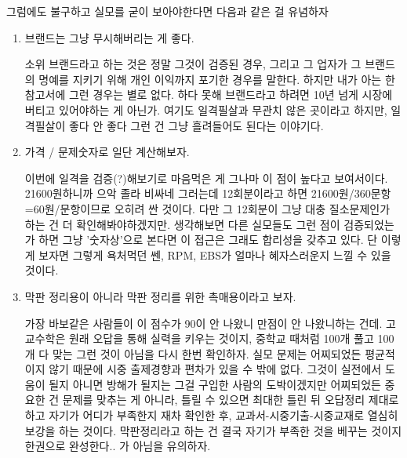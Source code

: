 그럼에도 불구하고 실모를 굳이 보아야한다면 다음과 같은 걸 유념하자
\vspace{5mm}
\begin{enumerate}
    \item 브랜드는 그냥 무시해버리는 게 좋다.
    \vspace{5mm}
    
    소위 브랜드라고 하는 것은 정말 그것이 검증된 경우,
    그리고 그 업자가 그 브랜드의 명예를 지키기 위해 개인 이익까지 포기한 경우를 말한다.
    하지만 내가 아는 한 참고서에 그런 경우는 별로 없다.
    하다 못해 브랜드라고 하려면 10년 넘게 시장에 버티고 있어야하는 게 아닌가.
    여기도 일격필살과 무관치 않은 곳이라고 하지만, 일격필살이 좋다 안 좋다 그런 건 그냥 흘려들어도 된다는 이야기다.
    \vspace{5mm}
    
    \item  가격 / 문제숫자로 일단 계산해보자.
    \vspace{5mm}
    
    이번에 일격을 검증(?)해보기로 마음먹은 게 그나마 이 점이 높다고 보여서이다.
    21600원하니까 으악 졸라 비싸네 그러는데 12회분이라고 하면 21600원/360문항=60원/문항이므로 오히려 싼 것이다.
    다만 그 12회분이 그냥 대충 질소문제인가 하는 건 더 확인해봐야하겠지만.
    생각해보면 다른 실모들도 그런 점이 검증되었는가 하면 그냥 '숫자상'으로 본다면 이 접근은 그래도 합리성을 갖추고 있다.
    단 이렇게 보자면 그렇게 욕처먹던 쎈, RPM, EBS가 얼마나 혜자스러운지 느낄 수 있을 것이다.
    \vspace{5mm}
    
    \item  막판 정리용이 아니라 막판 정리를 위한 촉매용이라고 보자.
    \vspace{5mm}
    
    가장 바보같은 사람들이 이 점수가 90이 안 나왔니 만점이 안 나왔니하는 건데.
    고교수학은 원래 오답을 통해 실력을 키우는 것이지, 중학교 때처럼 100개 풀고 100개 다 맞는 그런 것이 아님을 다시 한번 확인하자.
    실모 문제는 어찌되었든 평균적이지 않기 때문에 시중 출제경향과 편차가 있을 수 밖에 없다.
    그것이 실전에서 도움이 될지 아니면 방해가 될지는 그걸 구입한 사람의 도박이겠지만
    어찌되었든 중요한 건 문제를 맞추는 게 아니라, 틀릴 수 있으면 최대한 틀린 뒤 오답정리 제대로 하고
    자기가 어디가 부족한지 재차 확인한 후, 교과서-시중기출-시중교재로 열심히 보강을 하는 것이다.
    막판정리라고 하는 건 결국 자기가 부족한 것을 베꾸는 것이지 한권으로 완성한다.. 가 아님을 유의하자.
    \vspace{5mm}
    

\end{enumerate}
